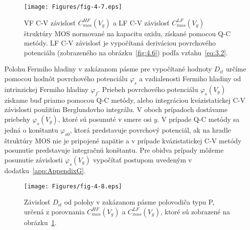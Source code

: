 \begin{figure}[h!]\centering
  \begin{minipage}[c]{\myfiguresize}
    \begin{center}
      \texttt{[image: Figures/fig-4-7.eps]}
      \caption[VF C-V závislosť $C_{mos}^{HF}(V_{g})$ a LF C-V
        závislosť $C_{mos}^{LF}(V_{g})$ štruktúry MOS normované na
        kapacitu oxidu, získané pomocou Q-C metódy]{VF C-V závislosť
        $C_{mos}^{HF}(V_{g})$ a LF C-V závislosť $C_{mos}^{LF}(V_{g})$
        štruktúry MOS normované na kapacitu oxidu, získané pomocou Q-C
        metódy.  LF C-V závislosť je vypočítaná deriváciou povrchového
        potenciálu (zobrazeného na obrázku~\ref{fig:4.6}) podľa
        vzťahu~\ref{eq:3.2}.}\label{fig:4.7}
    \end{center}
  \end{minipage}
\end{figure}

\par Polohu Fermiho hladiny v zakázanom pásme pre vypočítané hodnoty
$D_{it}$ určíme pomocou hodnôt povrchového potenciálu $\varphi_{s}$ a
vzdialenosti Fermiho hladiny od intrinzickej Fermiho hladiny
$\varphi_{f}$. Priebeh povrchového potenciálu $\varphi_{s}(V_{g})$
získame buď priamo pomocou Q-C metódy, alebo integráciou
kvázistatickej C-V závislosti použitím Berglundovho integrálu. V oboch
prípadoch dostávame priebehy $\varphi_{s}(V_{g})$, ktoré sú posunuté v
smere osi $y$. V prípade Q-C metódy sa jedná o konštantu
$\varphi_{s0}$, ktorá predstavuje povrchový potenciál, ak na hradle
štruktúry MOS nie je pripojené napätie a v prípade kvázistatickej C-V
metódy posunutie predstavuje integračnú konštantu. Pre obidva prípady
môžeme posunutie závislosti $\varphi_{s}(V_{g})$ vypočítať postupom
uvedeným v dodatku~\ref{app:AppendixG}.

\begin{figure}[h!]\centering
  \begin{minipage}[c]{\myfiguresize}
    \begin{center}
      \texttt{[image: Figures/fig-4-8.eps]}
      \caption[Závislosť $D_{it}$ od polohy v zakázanom pásme
        polovodiča typu P, určená z porovnania $C_{mos}^{HF}(V_{g})$ a
        $C_{mos}^{LF}(V_{g})$]{Závislosť $D_{it}$ od polohy v
        zakázanom pásme polovodiča typu P, určená z porovnania
        $C_{mos}^{HF}(V_{g})$ a $C_{mos}^{LF}(V_{g})$, ktoré sú
        zobrazené na obrázku~\ref{fig:4.7}.}\label{fig:4.8}
    \end{center}
  \end{minipage}
\end{figure}

